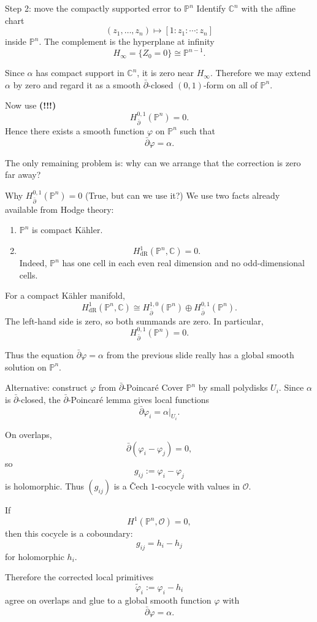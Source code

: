 \documentclass[aspectratio=169,11pt]{beamer}
\newcommand{\db}{\bar\partial}
\newcommand{\C}{\mathbb C}
\begin{document}
\begin{frame}{Step 2: move the compactly supported error to $\mathbb P^n$}
Identify $\C^n$ with the affine chart
\[
(z_1,\ldots,z_n)\longmapsto[1:z_1:\cdots:z_n]
\]
inside $\mathbb P^n$.
The complement is the hyperplane at infinity
\[
H_\infty=\{Z_0=0\}\cong\mathbb P^{n-1}.
\]

Since $\alpha$ has compact support in $\C^n$, it is zero near
$H_\infty$. Therefore we may extend $\alpha$ by zero and regard it as a
smooth $\db$-closed $(0,1)$-form on all of $\mathbb P^n$.

Now use {\bf (!!!)}
\[
\boxed{H^{0,1}_{\db}(\mathbb P^n)=0.}
\]
Hence there exists a smooth function $\varphi$ on $\mathbb P^n$ such that
\[
\boxed{\db\varphi=\alpha.}
\]

The only remaining problem is: why can we arrange that the correction is
zero far away?
\end{frame}

\begin{frame}{Why $H^{0,1}_{\db}(\mathbb
P^n)=0$ (True, but can we use it?)}
We use two facts already available from Hodge theory:
\begin{enumerate}
\item $\mathbb P^n$ is compact K\"ahler.
\item
\[
H^1_{\mathrm{dR}}(\mathbb P^n,\C)=0.
\]
Indeed, $\mathbb P^n$ has one cell in each even real dimension and no
odd-dimensional cells.
\end{enumerate}

For a compact K\"ahler manifold,
\[
H^1_{\mathrm{dR}}(\mathbb P^n,\C)
\cong
H^{1,0}_{\db}(\mathbb P^n)
\oplus
H^{0,1}_{\db}(\mathbb P^n).
\]
The left-hand side is zero, so both summands are zero. In particular,
\[
\boxed{H^{0,1}_{\db}(\mathbb P^n)=0.}
\]

Thus the equation $\db\varphi=\alpha$ from the previous slide really has
a global smooth solution on $\mathbb P^n$.
\end{frame}

\begin{frame}{Alternative: construct $\varphi$ from $\db$-Poincar\'e}
Cover $\mathbb P^n$ by small polydisks $U_i$.
Since $\alpha$ is $\db$-closed, the $\db$-Poincar\'e lemma gives
local functions
\[
\db\varphi_i=\alpha|_{U_i}.
\]

On overlaps,
\[
\db(\varphi_i-\varphi_j)=0,
\]
so
\[
g_{ij}:=\varphi_i-\varphi_j
\]
is holomorphic. Thus $(g_{ij})$ is a \v Cech $1$-cocycle with values in
$\mathcal O$.

If
\[
H^1(\mathbb P^n,\mathcal O)=0,
\]
then this cocycle is a coboundary:
\[
g_{ij}=h_i-h_j
\]
for holomorphic $h_i$.

Therefore the corrected local primitives
\[
\widetilde\varphi_i:=\varphi_i-h_i
\]
agree on overlaps and glue to a global smooth function $\varphi$ with
\[
\boxed{\db\varphi=\alpha.}
\]
\end{frame}
\end{document}
